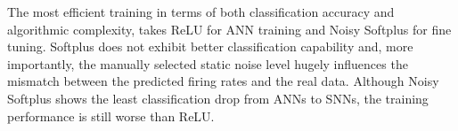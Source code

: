 \documentclass{article}
\begin{document}




The most efficient training in terms of both classification accuracy and algorithmic complexity, takes ReLU for ANN training and Noisy Softplus for fine tuning.
Softplus does not exhibit better classification capability and, more importantly, the manually selected static noise level hugely influences the mismatch between the predicted firing rates and the real data.
Although Noisy Softplus shows the least classification drop from ANNs to SNNs, the training performance is still worse than ReLU.
\end{document}
